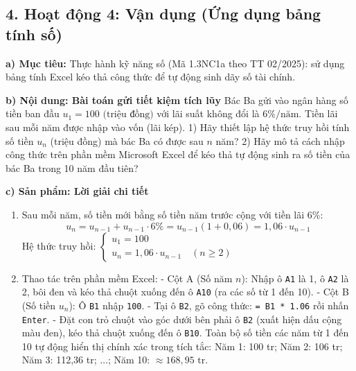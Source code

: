 \documentclass[12pt, a4paper]{article}
\begin{document}
\subsection*{4. Hoạt động 4: Vận dụng (Ứng dụng bảng tính số)}  
  
\noindent \textbf{a) Mục tiêu:}  
Thực hành kỹ năng số (Mã 1.3NC1a theo TT 02/2025): sử dụng bảng tính Excel kéo thả công thức để tự động sinh dãy số tài chính.  
  
\noindent \textbf{b) Nội dung: Bài toán gửi tiết kiệm tích lũy}  
Bác Ba gửi vào ngân hàng số tiền ban đầu $u_1 = 100\text{ (triệu đồng)}$ với lãi suất không đổi là $6\%/\text{năm}$. Tiền lãi sau mỗi năm được nhập vào vốn (lãi kép).  
1) Hãy thiết lập hệ thức truy hồi tính số tiền $u_n$ (triệu đồng) mà bác Ba có được sau $n$ năm?  
2) Hãy mô tả cách nhập công thức trên phần mềm Microsoft Excel để kéo thả tự động sinh ra số tiền của bác Ba trong 10 năm đầu tiên?  
  
\noindent \textbf{c) Sản phẩm: Lời giải chi tiết}  
\begin{enumerate}[leftmargin=0.6cm]  
    \item Sau mỗi năm, số tiền mới bằng số tiền năm trước cộng với tiền lãi $6\%$:  
    $$u_n = u_{n-1} + u_{n-1} \cdot 6\% = u_{n-1}(1 + 0{,}06) = 1{,}06 \cdot u_{n-1}$$  
    Hệ thức truy hồi: $\begin{cases} u_1 = 100 \\ u_n = 1{,}06 \cdot u_{n-1} \quad (n \ge 2) \end{cases}$  
    \item Thao tác trên phần mềm Excel:  
    - Cột A (Số năm $n$): Nhập ô \texttt{A1} là 1, ô \texttt{A2} là 2, bôi đen và kéo thả chuột xuống đến ô \texttt{A10} (ra các số từ 1 đến 10).  
    - Cột B (Số tiền $u_n$): Ô \texttt{B1} nhập \texttt{100}.  
    - Tại ô \texttt{B2}, gõ công thức: \texttt{= B1 * 1.06} rồi nhấn \texttt{Enter}.  
    - Đặt con trỏ chuột vào góc dưới bên phải ô \texttt{B2} (xuất hiện dấu cộng màu đen), kéo thả chuột xuống đến ô \texttt{B10}.  
    Toàn bộ số tiền các năm từ 1 đến 10 tự động hiển thị chính xác trong tích tắc:  
    Năm 1: 100 tr; Năm 2: 106 tr; Năm 3: 112,36 tr; $\dots$; Năm 10: $\approx 168{,}95\text{ tr}$.  
\end{enumerate}  
  
\end{document}
